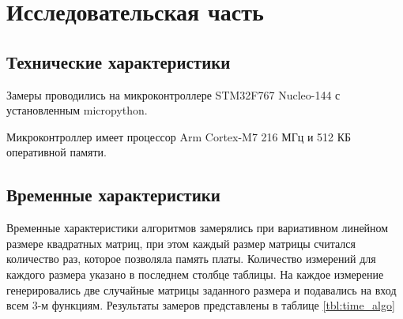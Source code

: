 \chapter{Исследовательская часть}

\section{Технические характеристики}
Замеры проводились на микроконтроллере STM32F767 Nucleo-144 с установленным  micropython.

Микроконтроллер имеет процессор Arm Cortex-M7 216 МГц и 512 КБ оперативной памяти.

\section{Временные характеристики}
Временные характеристики алгоритмов замерялись при вариативном линейном размере квадратных матриц, при этом каждый размер матрицы считался количество раз, которое позволяла память платы. Количество измерений для каждого размера указано в последнем столбце таблицы. На каждое измерение генерировались две случайные матрицы заданного размера и подавались на вход всем 3-м функциям. Результаты замеров представлены в таблице \ref{tbl:time_algo}



